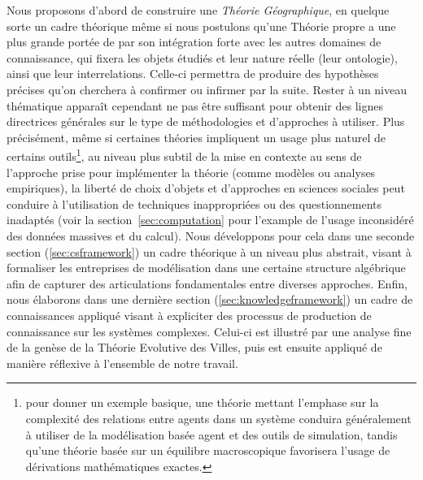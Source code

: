 {Nous proposons d'abord de construire une \emph{Théorie Géographique}, en quelque sorte un cadre théorique même si nous postulons qu'une Théorie propre a une plus grande portée de par son intégration forte avec les autres domaines de connaissance, qui fixera les objets étudiés et leur nature réelle (leur ontologie), ainsi que leur interrelations. Celle-ci permettra de produire des hypothèses précises qu'on cherchera à confirmer ou infirmer par la suite. Rester à un niveau thématique apparaît cependant ne pas être suffisant pour obtenir des lignes directrices générales sur le type de méthodologies et d'approches à utiliser. Plus précisément, même si certaines théories impliquent un usage plus naturel de certains outils\footnote{pour donner un exemple basique, une théorie mettant l'emphase sur la complexité des relations entre agents dans un système conduira généralement à utiliser de la modélisation basée agent et des outils de simulation, tandis qu'une théorie basée sur un équilibre macroscopique favorisera l'usage de dérivations mathématiques exactes.}, au niveau plus subtil de la mise en contexte au sens de l'approche prise pour implémenter la théorie (comme modèles ou analyses empiriques), la liberté de choix d'objets et d'approches en sciences sociales peut conduire à l'utilisation de techniques inappropriées ou des questionnements inadaptés (voir la section~\ref{sec:computation} pour l'example de l'usage inconsidéré des données massives et du calcul). Nous développons pour cela dans une seconde section (\ref{sec:csframework}) un cadre théorique à un niveau plus abstrait, visant à formaliser les entreprises de modélisation dans une certaine structure algébrique afin de capturer des articulations fondamentales entre diverses approches. Enfin, nous élaborons dans une dernière section (\ref{sec:knowledgeframework}) un cadre de connaissances appliqué visant à expliciter des processus de production de connaissance sur les systèmes complexes. Celui-ci est illustré par une analyse fine de la genèse de la Théorie Evolutive des Villes, puis est ensuite appliqué de manière réflexive à l'ensemble de notre travail.
}



